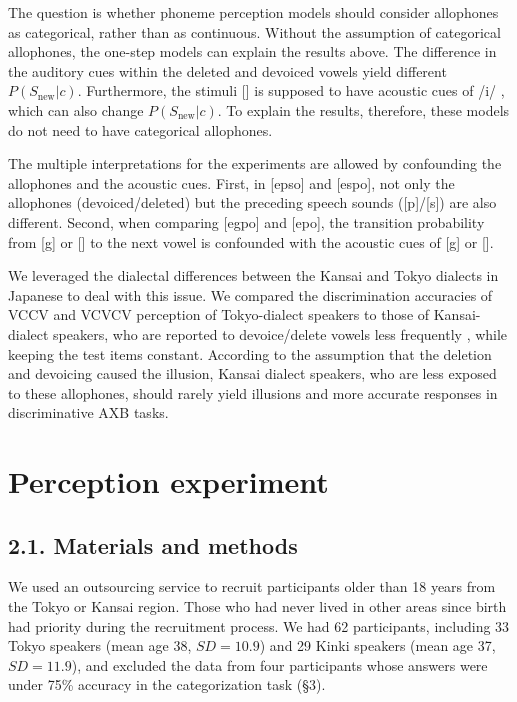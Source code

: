 \documentclass[a4paper,11pt,twocolumn]{article}
\begin{document}
The question is whether phoneme perception models should consider allophones as categorical, rather than as continuous. Without the assumption of categorical allophones, the one-step models can explain the results above. The difference in the auditory cues within the deleted and devoiced vowels yield different $P(S_{\text{new}}|c)$. Furthermore, the stimuli [\textctc] is supposed to have acoustic cues of /i/ \cite{kubozono1999japanese_eng}, which can also change $P(S_{\text{new}}|c)$. To explain the results, therefore, these models do not need to have categorical allophones.

The multiple interpretations for the experiments are allowed by confounding the allophones and the acoustic cues. First, in [ep\textsubring{\textturnm}so] and [espo], not only the allophones (devoiced/deleted) but the preceding speech sounds ([p]/[s]) are also different. Second, when comparing [egpo] and [e\textctc{}po], the transition probability from [g] or [\textctc] to the next vowel is confounded with the acoustic cues of [g] or [\textctc].

We leveraged the dialectal differences between the Kansai and Tokyo dialects in Japanese to deal with this issue. We compared the discrimination accuracies of VCCV and VCVCV perception of Tokyo-dialect speakers to those of Kansai-dialect speakers, who are reported to devoice/delete vowels less frequently \cite{byun2011_eng, byun2012_eng}, while keeping the test items constant. According to the assumption that the deletion and devoicing caused the illusion, Kansai dialect speakers, who are less exposed to these allophones, should rarely yield illusions and more accurate responses in discriminative AXB tasks.

\section{Perception experiment}

\subsection{2.1. Materials and methods}

We used an outsourcing service to recruit participants older than 18 years from the Tokyo or Kansai region. Those who had never lived in other areas since birth had priority during the recruitment process. We had 62 participants, including 33 Tokyo speakers (mean age 38, $SD = 10.9$) and 29 Kinki speakers (mean age 37, $SD = 11.9$), and excluded the data from four participants whose answers were under 75\% accuracy in the categorization task (\S3).
\end{document}
